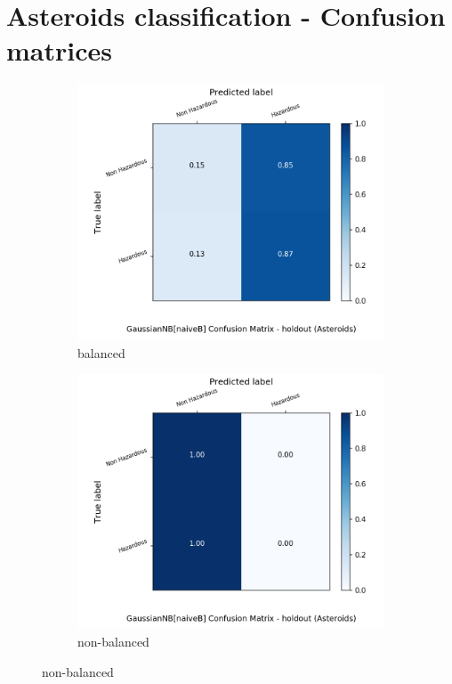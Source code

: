 \section{Asteroids classification - Confusion matrices}\label{app:asteroids_conf_matr}

\begin{figure}[H]
	\centering
	\begin{subfigure}{.5\textwidth}
		\centering
		\includegraphics[width=1.1\textwidth]{Plots/asteroids/asteroids_GaussianNB_naiveB_balance_True_holdout.png}
		\caption{balanced}
	\end{subfigure}%
	\begin{subfigure}{.5\textwidth}
		\centering
		\includegraphics[width=1.1\textwidth]{Plots/asteroids/asteroids_GaussianNB_naiveB_balance_False_holdout.png}
		\caption{non-balanced}
	\end{subfigure}
\end{figure}

